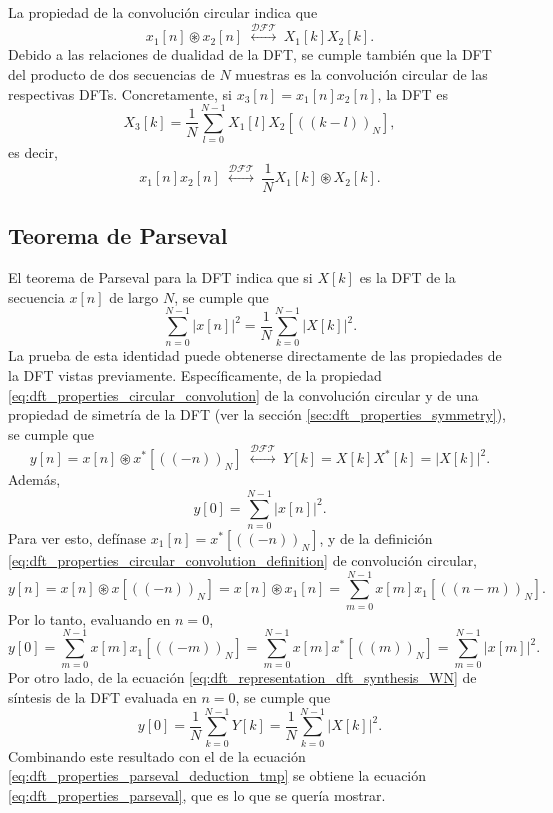 \documentclass[a4paper]{report}
\begin{document}
La propiedad de la convolución circular indica que
\begin{equation}\label{eq:dft_properties_circular_convolution}
 x_1[n]\circledast x_2[n]\;\overset{\mathcal{DFT}}{\longleftrightarrow}\;X_1[k]X_2[k].
\end{equation}
Debido a las relaciones de dualidad de la DFT, se cumple también que la DFT del producto de dos secuencias de \(N\) muestras es la convolución circular de las respectivas DFTs. Concretamente, si \(x_3[n]=x_1[n]x_2[n]\), la DFT es
\[
 X_3[k]=\frac{1}{N}\sum_{l=0}^{N-1}X_1[l]X_2[((k-l))_N],
\]
es decir,
\begin{equation}\label{eq:dft_properties_product}
 x_1[n]x_2[n]\;\overset{\mathcal{DFT}}{\longleftrightarrow}\;\frac{1}{N}X_1[k]\circledast X_2[k].
\end{equation}

\subsection{Teorema de Parseval}

El teorema de Parseval para la DFT indica que si \(X[k]\) es la DFT de la secuencia \(x[n]\) de largo \(N\), se cumple que  
\begin{equation}\label{eq:dft_properties_parseval}
 \sum_{n=0}^{N-1}|x[n]|^2=\frac{1}{N}\sum_{k=0}^{N-1}|X[k]|^2.
\end{equation}
La prueba de esta identidad puede obtenerse directamente de las propiedades de la DFT vistas previamente. Específicamente, de la propiedad \ref{eq:dft_properties_circular_convolution} de la convolución circular y de una propiedad de simetría de la DFT (ver la sección \ref{sec:dft_properties_symmetry}), se cumple que 
\[
 y[n]=x[n]\circledast x^*[((-n))_N]\;\overset{\mathcal{DFT}}{\longleftrightarrow}\;Y[k]=X[k]X^*[k]=|X[k]|^2. 
\]
Además,
\begin{equation}\label{eq:dft_properties_parseval_deduction_tmp}
 y[0]=\sum_{n=0}^{N-1}|x[n]|^2. 
\end{equation}
Para ver esto, defínase \(x_1[n]=x^*[((-n))_N]\), y de la definición \ref{eq:dft_properties_circular_convolution_definition} de convolución circular,
\[
 y[n]=x[n]\circledast x[((-n))_N]=x[n]\circledast x_1[n]=\sum_{m=0}^{N-1}x[m]x_1[((n-m))_N].
\]
Por lo tanto, evaluando en \(n=0\),
\[
 y[0]=\sum_{m=0}^{N-1}x[m]x_1[((-m))_N]=\sum_{m=0}^{N-1}x[m]x^*[((m))_N]=\sum_{m=0}^{N-1}|x[m]|^2.
\]
Por otro lado, de la ecuación \ref{eq:dft_representation_dft_synthesis_WN} de síntesis de la DFT evaluada en \(n=0\), se cumple que 
\[
 y[0]=\frac{1}{N}\sum_{k=0}^{N-1}Y[k]=\frac{1}{N}\sum_{k=0}^{N-1}|X[k]|^2.
\]
Combinando este resultado con el de la ecuación \ref{eq:dft_properties_parseval_deduction_tmp} se obtiene la ecuación \ref{eq:dft_properties_parseval}, que es lo que se quería mostrar. 
\end{document}
